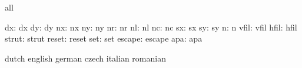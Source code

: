 \stopvariables




\startconstants            all

                       dx: dx
                       dy: dy
                       nx: nx
                       ny: ny
                       nr: nr
                       nl: nl
                       nc: nc
                       sx: sx
                       sy: sy
                        n: n
                     vfil: vfil
                     hfil: hfil
                    strut: strut
                    reset: reset
                      set: set
                   escape: escape
                      apa: apa

\stopconstants




\startvariables            dutch                     english
                           german                    czech
                           italian                   romanian

